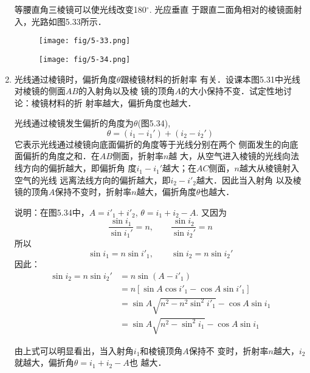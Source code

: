 \begin{enumerate}
\begin{solution}
    等腰直角三棱镜可以使光线改变180$^\circ$. 光应垂直
    于跟直二面角相对的棱镜面射入，光路如图5.33所示．
    \begin{figure}[htp]\centering
        \begin{minipage}[t]{0.48\textwidth}
        \centering
    \texttt{[image: fig/5-33.png]}
        \caption{}
        \end{minipage}
        \begin{minipage}[t]{0.48\textwidth}
        \centering
    \texttt{[image: fig/5-34.png]}
        \caption{}
        \end{minipage}
        \end{figure}
\end{solution}
\item 光线通过棱镜时，偏折角度$\theta$跟棱镜材料的折射率
有关．设课本图5.31中光线对棱镜的侧面$AB$的入射角以及棱
镜的顶角$A$的大小保持不变．试定性地讨论：棱镜材料的折
射率越大，偏折角度也越大．

\begin{solution}
    光线通过棱镜发生偏折的角度为$\theta$(图5.34),
\[  \theta=(i_1-i_1')+(i_2-i_2')\]
    它表示光线通过棱镜向底面偏折的角度等于光线分别在两个
    侧面发生的向底面偏折的角度之和．在$AB$侧面，折射率$n$越
    大，从空气进入棱镜的光线向法线方向的偏折越大，即偏折角
    度$i_1-i_1'$越大；在$AC$侧面，$n$越大从棱镜射入空气的光线
    远离法线方向的偏折越大，即$i_2-i'_2$越大．因此当入射角
    以及棱镜的顶角$A$保持不变时，折射率$n$越大，偏折角度$\theta$也越大．

说明：在图5.34中，$A=i'_1+i'_2$, $\theta=i_1+i_2-A$. 又因为
\[\frac{\sin i_1}{\sin i_1'}=n,\qquad \frac{\sin i_2}{\sin i_2'}=n\]
所以
\[\sin i_1=n\sin i'_1,\qquad \sin i_2=n\sin i_2'\]
因此：
\[\begin{split}
    \sin i_2=n\sin i_2'&=n\sin (A-i'_1)\\
    &=n\left[\sin A\cos i'_1-\cos A\sin i'_1\right]\\
    &=\sin A\sqrt{n^2-n^2\sin^2 i'_1}-\cos A\sin i_1\\
    &=\sin A\sqrt{n^2-\sin^2 i_1}-\cos A\sin i_1
\end{split}\]

由上式可以明显看出，当入射角$i_1$和棱镜顶角$A$保持不
变时，折射率$n$越大，$i_2$就越大，偏折角$\theta=i_1+i_2-A$也
越大．
\end{solution}
\end{enumerate}


